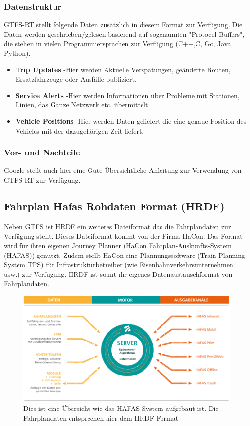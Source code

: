 \documentclass[a4paper,12pt]{scrartcl}
\begin{document}
\subsubsection{Datenstruktur}
\label{sec:gtfs-rt-datenstruktur}
GTFS-RT stellt folgende Daten zusätzlich in diesem Format zur Verfügung. Die Daten werden geschrieben/gelesen basierend auf sogenannten "Protocol Buffers", die stehen in vielen Programmiersprachen zur Verfügung (C++,C, Go, Java, Python).\cite{gtfs-rt}
\begin{itemize}
	\item{\textbf{Trip Updates}} -Hier werden Aktuelle Verspätungen, geänderte Routen, Ersatzfahrzeuge oder Ausfälle publiziert.  
	\item{\textbf{Service Alerts}} -Hier werden Informationen über Probleme mit Stationen,  Linien, das Ganze Netzwerk etc. übermittelt. 
	\item{\textbf{Vehicle Positions}} -Hier werden Daten geliefert die eine genaue Position des Vehicles mit der dazugehörigen Zeit liefert.\cite{gtfs-rt-google} 
\end{itemize}


\subsubsection{Vor- und Nachteile}
\label{sec:gtfs-rt-vornachteile}
Google stellt auch hier eine Gute Übersichtliche Anleitung zur Verwendung von GTFS-RT zur Verfügung.

\subsection{Fahrplan Hafas Rohdaten Format (HRDF)}
\label{subsec:hrdf}
Neben GTFS ist HRDF ein weiteres Dateiformat das die Fahrplandaten zur Verfügung stellt. 
Dieses Dateiformat kommt von der Firma HaCon. Das Format wird für ihren eigenen Journey Planner (HaCon Fahrplan-Auskunfts-System (HAFAS)) genutzt. Zudem stellt HaCon eine Plannungssoftware (Train Planning System TPS) für Infrastrukturbetreiber (wie Eisenbahnverkehrsunternehmen usw.) zur Verfügung. HRDF ist somit ihr eigenes Datenaustauschformat von Fahrplandaten.\cite{haconUebersicht}


\begin{figure}[]
	\centering
	\includegraphics[width=12cm]{img/HAFAS.png}
	\caption{Dies ist eine Übersicht wie das HAFAS System aufgebaut ist. Die Fahrplandaten entsprechen hier dem HRDF-Format. \cite{haconUebersicht}}
	\label{fig:hafas-uebersicht}
\end{figure}
\end{document}
